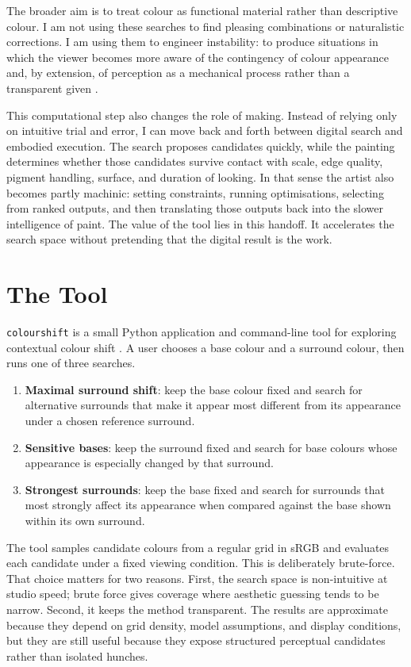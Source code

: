 \documentclass[11pt]{article}
\begin{document}
The broader aim is to treat colour as functional material rather than descriptive colour. I am not using these searches to find pleasing combinations or naturalistic corrections. I am using them to engineer instability: to produce situations in which the viewer becomes more aware of the contingency of colour appearance and, by extension, of perception as a mechanical process rather than a transparent given \parencite{grant2025machines}.

This computational step also changes the role of making. Instead of relying only on intuitive trial and error, I can move back and forth between digital search and embodied execution. The search proposes candidates quickly, while the painting determines whether those candidates survive contact with scale, edge quality, pigment handling, surface, and duration of looking. In that sense the artist also becomes partly machinic: setting constraints, running optimisations, selecting from ranked outputs, and then translating those outputs back into the slower intelligence of paint. The value of the tool lies in this handoff. It accelerates the search space without pretending that the digital result is the work.

\section{The Tool}
\texttt{colourshift} is a small Python application and command-line tool for exploring contextual colour shift \parencite{colour-science,colourshift}. A user chooses a base colour and a surround colour, then runs one of three searches.

\begin{enumerate}
  \item \textbf{Maximal surround shift}: keep the base colour fixed and search for alternative surrounds that make it appear most different from its appearance under a chosen reference surround.
  \item \textbf{Sensitive bases}: keep the surround fixed and search for base colours whose appearance is especially changed by that surround.
  \item \textbf{Strongest surrounds}: keep the base fixed and search for surrounds that most strongly affect its appearance when compared against the base shown within its own surround.
\end{enumerate}

The tool samples candidate colours from a regular grid in sRGB and evaluates each candidate under a fixed viewing condition. This is deliberately brute-force. That choice matters for two reasons. First, the search space is non-intuitive at studio speed; brute force gives coverage where aesthetic guessing tends to be narrow. Second, it keeps the method transparent. The results are approximate because they depend on grid density, model assumptions, and display conditions, but they are still useful because they expose structured perceptual candidates rather than isolated hunches.
\end{document}
